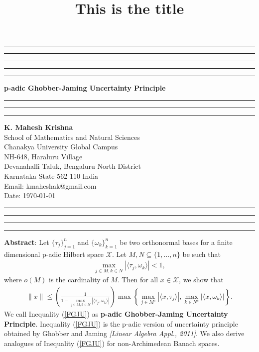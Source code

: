 \documentclass{amsart}
\title{This is the title}
\begin{document}
	\vspace{0.9cm}	
\hrule\hrule\hrule\hrule\hrule
\vspace{0.3cm}	
\begin{center}
{\bf{p-adic Ghobber-Jaming Uncertainty Principle}}\\
\vspace{0.3cm}
\hrule\hrule\hrule
\vspace{0.3cm}
\textbf{K. Mahesh Krishna}\\
School of Mathematics and Natural Sciences\\
Chanakya University Global Campus\\
NH-648, Haraluru Village\\
Devanahalli Taluk, 	Bengaluru  North District\\
Karnataka State 562 110 India \\
Email: kmaheshak@gmail.com\\

Date: \today
\hrule\hrule
\end{center}

\hrule\hrule
\vspace{0.5cm}
\textbf{Abstract}: Let $\{\tau_j\}_{j=1}^n$ and $\{\omega_k\}_{k=1}^n$ be  two orthonormal bases  for a finite dimensional p-adic Hilbert space $\mathcal{X}$. Let  $M,N\subseteq \{1, \dots, n\}$ be such that 
\begin{align*}
\displaystyle \max_{j \in M, k \in N}|\langle \tau_j, \omega_k \rangle|<1,
\end{align*}
where  $o(M)$  is the cardinality of  $M$. Then for all $x \in \mathcal{X}$,  we show that 
\begin{align}\label{FGJU}
	\|x\|\leq  \left(\frac{1}{1-\displaystyle \max_{j \in M, k \in N}|\langle \tau_j, \omega_k \rangle|}\right)\max\left\{\displaystyle \max_{j \in M^c}|\langle x, \tau_j\rangle |, \displaystyle \max_{k \in N^c}|\langle x, \omega_k\rangle |\right\}.
\end{align}
 We call Inequality (\ref{FGJU}) as \textbf{p-adic Ghobber-Jaming Uncertainty Principle}. Inequality (\ref{FGJU}) is the p-adic version of uncertainty principle obtained by Ghobber and Jaming \textit{[Linear Algebra Appl., 2011]}. We also derive analogues of Inequality (\ref{FGJU}) for non-Archimedean Banach spaces. 
\end{document}
